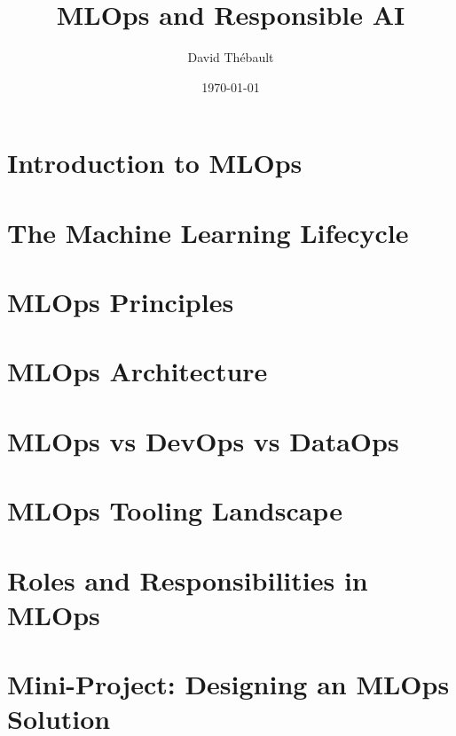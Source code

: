 \documentclass[11pt,a4paper]{book}
\title{MLOps and Responsible AI}
\author{David Thébault}
\date{\today}
\begin{document}
\frontmatter

\maketitle

\tableofcontents

\mainmatter


\chapter{Introduction to MLOps}



\chapter{The Machine Learning Lifecycle}



\chapter{MLOps Principles}



\chapter{MLOps Architecture}



\chapter{MLOps vs DevOps vs DataOps}



\chapter{MLOps Tooling Landscape}



\chapter{Roles and Responsibilities in MLOps}



\chapter{Mini-Project: Designing an MLOps Solution}


\backmatter
\end{document}

